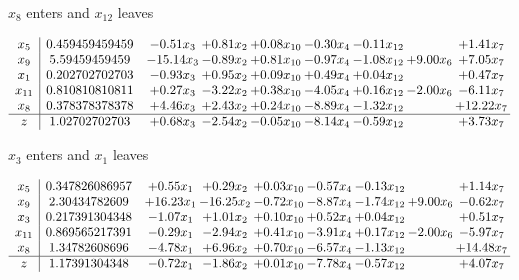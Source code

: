 \documentclass[9pt]{article}
\begin{document}
 $ x_{8} $ enters and $ x_{12} $ leaves 

 \[\begin{array}{c| c c@{\hskip 2pt} c@{\hskip 2pt} c@{\hskip 2pt} c@{\hskip 2pt} c@{\hskip 2pt} c@{\hskip 2pt} c@{\hskip 2pt} }
 x_{5}   &  0.459459459459 & -0.51 x_{3} & +  0.81 x_{2} & +  0.08 x_{10} & -0.30 x_{4} & -0.11 x_{12} &   & +  1.41 x_{7}\\
 x_{9}   &  5.59459459459 & -15.14 x_{3} & -0.89 x_{2} & +  0.81 x_{10} & -0.97 x_{4} & -1.08 x_{12} & +  9.00 x_{6} & +  7.05 x_{7}\\
 x_{1}   &  0.202702702703 & -0.93 x_{3} & +  0.95 x_{2} & +  0.09 x_{10} & +  0.49 x_{4} & +  0.04 x_{12} &   & +  0.47 x_{7}\\
 x_{11}   &  0.810810810811 & +  0.27 x_{3} & -3.22 x_{2} & +  0.38 x_{10} & -4.05 x_{4} & +  0.16 x_{12} & -2.00 x_{6} & -6.11 x_{7}\\
 x_{8}   &  0.378378378378 & +  4.46 x_{3} & +  2.43 x_{2} & +  0.24 x_{10} & -8.89 x_{4} & -1.32 x_{12} &   & + 12.22 x_{7}\\
\hline
z    &  1.02702702703 & +  0.68 x_{3} & -2.54 x_{2} & -0.05 x_{10} & -8.14 x_{4} & -0.59 x_{12} &   & +  3.73 x_{7}\\
\end{array}\]


 $ x_{3} $ enters and $ x_{1} $ leaves 

 \[\begin{array}{c| c c@{\hskip 2pt} c@{\hskip 2pt} c@{\hskip 2pt} c@{\hskip 2pt} c@{\hskip 2pt} c@{\hskip 2pt} c@{\hskip 2pt} }
 x_{5}   &  0.347826086957 & +  0.55 x_{1} & +  0.29 x_{2} & +  0.03 x_{10} & -0.57 x_{4} & -0.13 x_{12} &   & +  1.14 x_{7}\\
 x_{9}   &  2.30434782609 & + 16.23 x_{1} & -16.25 x_{2} & -0.72 x_{10} & -8.87 x_{4} & -1.74 x_{12} & +  9.00 x_{6} & -0.62 x_{7}\\
 x_{3}   &  0.217391304348 & -1.07 x_{1} & +  1.01 x_{2} & +  0.10 x_{10} & +  0.52 x_{4} & +  0.04 x_{12} &   & +  0.51 x_{7}\\
 x_{11}   &  0.869565217391 & -0.29 x_{1} & -2.94 x_{2} & +  0.41 x_{10} & -3.91 x_{4} & +  0.17 x_{12} & -2.00 x_{6} & -5.97 x_{7}\\
 x_{8}   &  1.34782608696 & -4.78 x_{1} & +  6.96 x_{2} & +  0.70 x_{10} & -6.57 x_{4} & -1.13 x_{12} &   & + 14.48 x_{7}\\
\hline
z    &  1.17391304348 & -0.72 x_{1} & -1.86 x_{2} & +  0.01 x_{10} & -7.78 x_{4} & -0.57 x_{12} &   & +  4.07 x_{7}\\
\end{array}\]
\end{document}
